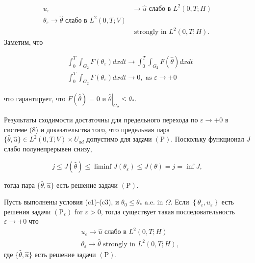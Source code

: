 \[
    \begin{aligned}
        u_{\varepsilon} & \rightarrow \widehat{u} \text { слабо в } L^{2}(0, T ; H) \\
        \theta_{\varepsilon} \rightarrow \widehat{\theta} \text { слабо в } L^{2}(0, T ; V) \\
        & \text { strongly in } L^{2}(0, T ; H).
    \end{aligned}
\]
Заметим, что

\[
    \begin{aligned}
        &\int_{0}^{T} \int_{G_{2}} F\left(\theta_{\varepsilon}\right) d x d t
        \rightarrow \int_{0}^{T} \int_{G_{2}} F(\widehat{\theta}) d x d t \\
        &\int_{0}^{T} \int_{G_{2}} F\left(\theta_{\varepsilon}\right) d x d t
        \rightarrow 0, \text { as } \varepsilon \rightarrow+0
    \end{aligned}
\]

что гарантирует, что $F(\widehat{\theta})=0$ и
$\left.\widehat{\theta}\right|_{G_{2}} \leq \theta_{*}$.

Результаты сходимости достаточны для предельного
перехода по $\varepsilon \rightarrow+0$ в системе (8)
и доказательства того, что предельная пара
$\{\widehat{\theta}, \widehat{u}\} \in L ^{2}(0, T ; V) \times U_{a d}$
допустимо для задачи $(\mathrm{P})$.
Поскольку функционал $J$ слабо полунепрерывен снизу,

\[
    j \leq J(\widehat{\theta})
    \leq \liminf J \left(\theta_{\varepsilon}\right)
    \leq J(\theta)=j=\inf J,
\]

тогда пара $\{\widehat{\theta}, \widehat{u}\}$ есть решение задачи $(\mathrm{P})$.

\begin{theorem}
    \label{th:3_2:3}
    Пусть выполнены условия (c1)-(c3), и $\theta_{0} \leq \theta_{*}$ a.e. in $\Omega$.
    Если $\left\{\theta_{\varepsilon}, u_{\varepsilon}\right\}$ есть решения задачи
    $\left(\mathrm{P}_{\varepsilon}\right)$ for $\varepsilon>0$, тогда существует
    такая последовательность$\varepsilon \rightarrow+0$ что
    \[
        \begin{aligned}
            &u_{\varepsilon} \rightarrow \widehat{u} \text { слабо в } L^{2}(0, T ; H) \\
            &\theta_{\varepsilon} \rightarrow \widehat{\theta} \text { strongly in } L^{2}(0, T ; H),
        \end{aligned}
    \]
    где $\{\widehat{\theta}, \widehat{u}\}$ есть решение задачи $(\mathrm{P})$.
\end{theorem}
